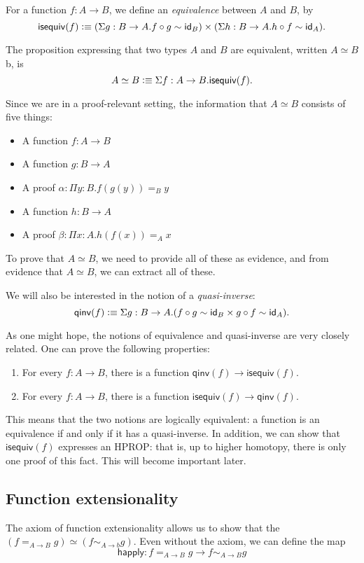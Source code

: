 \documentclass[12pt]{article}
\newcommand{\iseq}{\mathsf{isequiv}}
\newcommand{\qinv}{\mathsf{qinv}}
\newcommand{\happ}{\mathsf{happly}}
\newcommand*{\comp}{\mathbin{\circ}}
\begin{document}
For a function $f:A \to B$, we define an \emph{equivalence} between $A$ and
$B$, by $$\iseq(f)\defeq (\Sigma g: B\to A.f\comp g \sim \id_B)\times (\Sigma
h: B\to A.h\comp f \sim \id_A).$$
  
 The proposition expressing that two types $A$ and $B$ are equivalent, written
$A \simeq B$ b, is $$A\simeq B\defeq \Sigma f: A\to B.\iseq(f).$$
  
Since we are in a proof-relevant setting, the information that $A\simeq B$ 
consists of five things:
\begin{itemize}
 \item A function $f:A\to B$
 \item A function $g: B\to A$
 \item A proof $\alpha: \Pi y:B.f(g(y)) =_B y$
 \item A function $h: B\to A$
 \item A proof $\beta: \Pi x:A.h(f(x)) =_A x$
\end{itemize}

To prove that $A\simeq B$, we need to provide all of these as evidence, and from
evidence that $A\simeq B$, we can extract all of these.
  
 We will also be interested in the notion of a \emph{quasi-inverse}:
  $$\qinv(f)\defeq \Sigma g:B\to A.(f\comp g\sim \id_B \times g\comp f\sim \id_A).$$
  
As one might hope, the notions of equivalence and quasi-inverse are very closely related.
One can prove the following properties:

\begin{enumerate}
 \item For every $f:A\to B$, there is a function $\qinv(f) \to \iseq(f)$.
 \item For every $f:A\to B$, there is a function $\iseq(f) \to \qinv(f)$.
\end{enumerate}

This means that the two notions are logically equivalent: a function is an equivalence
if and only if it has a quasi-inverse. In addition, we can show that $\iseq(f)$ 
expresses an HPROP: that is, up to higher homotopy, there is only one proof of this fact.
This will become important later.

\subsection{Function extensionality}

The axiom of function extensionality allows us to show that the $(f =_{A \to B}
g) \simeq (f \sim_{A \to b} g)$.  Even without the axiom, we can define
the map $$ \happ: f =_{A\to B} g \to f\sim_{A\to B} g$$
\end{document}
